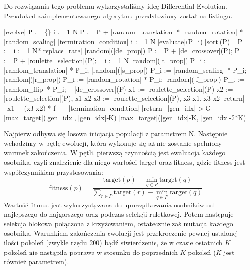 \documentclass[a4paper,12pt,leqno]{article}
\newcommand{\target}{\mathrm{target}}
\newcommand{\RETURN}{|return|\ }
\begin{document}
Do rozwiązania tego problemu wykorzystaliśmy ideę Differential Evolution. Pseudokod zaimplementowanego algorytmu przedstawiony został na listingu: 
\begin{program}
\FUNCT |evolve| \BODY
    P := \{\}
    \FOR i := 1 \TO N \DO
        P := P + |random_translation| * |random_rotation| * |random_scaling|
    \END
    \WHILE \NOT |termination_condition| \DO
        \FOR i := 1 \TO N \DO
            |evaluate|(P_i)
        \END
        |sort|(P) 
        ~
        P := 
        \FOR i := 1 \TO N*|replace_rate| \DO
            \IF |random|(|de_prop|)
                \THEN P := P + |de_crossover|(P);
                \ELSE P := P + |roulette_selection|(P); \FI
        \END
        ~
        \FOR i := 1 \TO N \DO 
            \IF |random|(|t_prop|)
	        \THEN P_i := |random_translation| * P_i; \FI
            \IF |random|(|s_prop|)
                \THEN P_i := |random_scaling| * P_i; \FI
            \IF |random|(|r_prop|)
                \THEN P_i := |random_rotation| * P_i; \FI
	    \IF |random|(|f_prop|)
                \THEN P_i := |random_flip| * P_i; \FI
        \END
    \END
\END
~
\FUNCT |de_crossover|(P) \BODY
    x1 := |roulette_selection|(P)
    x2 := |roulette_selection|(P),\; x1 \neq x2
    x3 := |roulette_selection|(P),\; x3 \neq x1,\; x3 \geq x2
    \RETURN x1 + (x3-x2) * f_
\END
~
\FUNCT |termination_condition| \BODY
    \RETURN |gen_idx| > G \OR 
	    |max_target|(|gen_idx|, |gen_idx|-K) \geq |max_target|(|gen_idx|-K, |gen_idx|-2*K)
\END
\end{program}

Najpierw odbywa się losowa inicjacja populacji z parametrem N. Następnie wchodzimy w pętlę ewolucji, która wykonuje się aż nie zostanie spełniony
warunek zakończenia. W pętli, pierwszą czynnością jest ewaluacja każdego osobnika, czyli znalezienie dla niego wartości target oraz fitness,
gdzie fitness jest współczynnikiem przystosowania:
\[ \mathrm{fitness}(p) = \frac{\target(p) - \min_{q \in P}\target(q)}{\sum_{r \in P} \target(r) - \min_{q \in P}\target(q)} \]
Wartość fitness jest wykorzystywana do uporządkowania osobników od najlepszego do najgorszego oraz podczas selekcji ruletkowej.
Potem następuje selekcja blokowa połączona z krzyżowaniem, ostatecznie zaś mutacja każdego osobnika. Warunkiem zakończenia ewolucji
jest przekroczenie pewnej ustalonej ilości pokoleń (zwykle rzędu 200) bądź stwierdzenie, że w czasie ostatnich $K$ pokoleń nie nastąpiła
poprawa w stosunku do poprzednich $K$ pokoleń ($K$ jest również parametrem).
\end{document}

